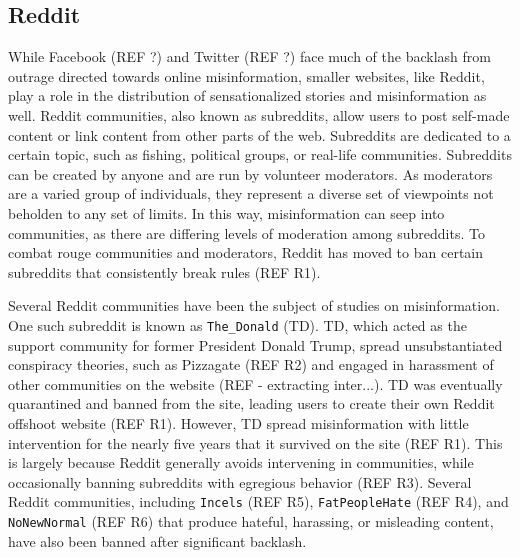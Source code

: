 \documentclass[12pt,oneside, letterpaper]{book}
\begin{document}
\subsection{Reddit}


\par While Facebook (REF ?) and Twitter (REF ?) face much of the backlash from outrage directed towards online misinformation, smaller websites, like Reddit, play a role in the distribution of sensationalized stories and misinformation as well. Reddit communities, also known as subreddits, allow users to post self-made content or link content from other parts of the web. Subreddits are dedicated to a certain topic, such as fishing, political groups, or real-life communities. Subreddits can be created by anyone and are run by volunteer moderators. As moderators are a varied group of individuals, they represent a diverse set of viewpoints not beholden to any set of limits. In this way, misinformation can seep into communities, as there are differing levels of moderation among subreddits. To combat rouge communities and moderators, Reddit has moved to ban certain subreddits that consistently break rules (REF R1).

\par Several Reddit communities have been the subject of studies on misinformation. One such subreddit is known as \texttt{The\_Donald} (TD). TD, which acted as the support community for former President Donald Trump, spread unsubstantiated conspiracy theories, such as Pizzagate (REF R2) and engaged in harassment of other communities on the website (REF - extracting inter...). TD was eventually quarantined and banned from the site, leading users to create their own Reddit offshoot website (REF R1). However, TD spread misinformation with little intervention for the nearly five years that it survived on the site (REF R1). This is largely because Reddit generally avoids intervening in communities, while occasionally banning subreddits with egregious behavior (REF R3). Several Reddit communities, including \texttt{Incels} (REF R5), \texttt{FatPeopleHate} (REF R4), and \texttt{NoNewNormal} (REF R6) that produce hateful, harassing, or misleading content, have also been banned after significant backlash.
\end{document}
